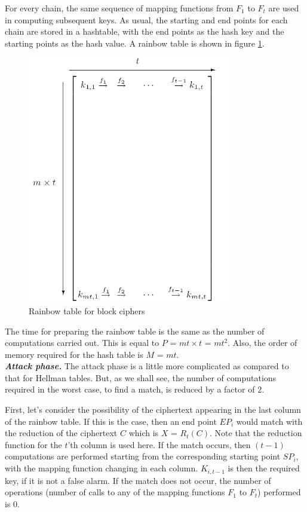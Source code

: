 For every chain, the same sequence of mapping functions from $F_1$ to $F_t$ are used in computing subsequent keys. As usual, the starting and end points for each chain are stored in a hashtable, with the end points as the hash key and the starting points as the hash value. A rainbow table is shown in figure \ref{fig:rainbow-table}.

\begin{figure}[ht!]
	\centering
		\includegraphics[width=3.5in]{./figures/rainbow-table.PNG}
	\caption{Rainbow table for block ciphers}	
	\label{fig:rainbow-table}
\end{figure}

The time for preparing the rainbow table is the same as the number of computations carried out. This is equal to $P$ = $mt \times t$ = $mt^2$. Also, the order of memory required for the hash table is $M$ = $mt$. \\

\noindent \textit{\textbf{Attack phase.}} The attack phase is a little more complicated as compared to that for Hellman tables. But, as we shall see, the number of computations required in the worst case, to find a match, is reduced by a factor of $2$. 

First, let's consider the possibility of the ciphertext appearing in the last column of the rainbow table. If this is the case, then an end point $EP_i$ would match with the reduction of the ciphertext $C$ which is $X$ = $R_t(C)$. Note that the reduction function for the $t$'th column is used here. If the match occurs, then $(t-1)$ computations are performed starting from the corresponding starting point $SP_i$, with the mapping function changing in each column. $K_{i,t-1}$ is then the required key, if it is not a false alarm. If the match does not occur, the number of operations (number of calls to any of the mapping functions $F_1$ to $F_t$) performed is $0$. 

